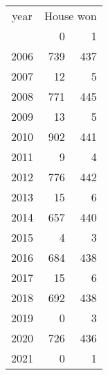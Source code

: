 \footnotesize\begin{tabular}[t]{lrr}
\toprule
\multicolumn{1}{c}{year} & \multicolumn{2}{c}{House won} \\
\cmidrule(l{3pt}r{3pt}){1-1} \cmidrule(l{3pt}r{3pt}){2-3}
  & 0 & 1\\
\midrule
2006 & 739 & 437\\
2007 & 12 & 5\\
2008 & 771 & 445\\
2009 & 13 & 5\\
2010 & 902 & 441\\
2011 & 9 & 4\\
2012 & 776 & 442\\
2013 & 15 & 6\\
2014 & 657 & 440\\
2015 & 4 & 3\\
2016 & 684 & 438\\
2017 & 15 & 6\\
2018 & 692 & 438\\
2019 & 0 & 3\\
2020 & 726 & 436\\
2021 & 0 & 1\\
\bottomrule
\end{tabular}
